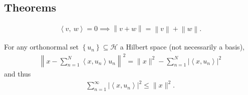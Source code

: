 \hypertarget{theorems-1}{%
\subsection{Theorems}\label{theorems-1}}

\begin{fact}[Pythagoras]

\begin{align*}
{\left\langle {v},~{w} \right\rangle} = 0 \implies {\left\lVert {v+w} \right\rVert} = {\left\lVert {v} \right\rVert} + {\left\lVert {w} \right\rVert}
.\end{align*}

\end{fact}

\begin{theorem}

For any orthonormal set
\(\left\{{u_{n}}\right\} \subseteq {\mathcal{H}}\) a Hilbert space (not
necessarily a basis),
\begin{align*}
\left\|x-\sum_{n=1}^{N}\left\langle x, u_{n}\right\rangle u_{n}\right\|^{2}=\|x\|^{2}-\sum_{n=1}^{N}\left|\left\langle x, u_{n}\right\rangle\right|^{2}
\end{align*}
and thus
\begin{align*}
\sum_{n=1}^{\infty}\left|\left\langle x, u_{n}\right\rangle\right|^{2} \leq\|x\|^{2}
.\end{align*}

\end{theorem}

